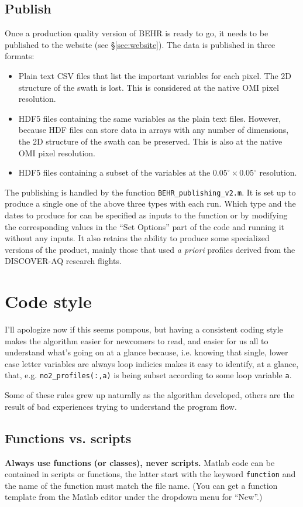 \documentclass[12pt]{article}
\begin{document}
	
	\subsection{Publish}
	Once a production quality version of BEHR is ready to go, it needs to be published to the website (see \S\ref{sec:website}). The data is published in three formats:
	\begin{itemize}
	\item Plain text CSV files that list the important variables for each pixel. The 2D structure of the swath is lost. This is considered at the native OMI pixel resolution.
	\item HDF5 files containing the same variables as the plain text files. However, because HDF files can store data in arrays with any number of dimensions, the 2D structure of the swath can be preserved. This is also at the native OMI pixel resolution.
	\item HDF5 files containing a subset of the variables at the $0.05^\circ \times 0.05^\circ$ resolution.
	\end{itemize}
	
	The publishing is handled by the function \lstinline$BEHR_publishing_v2.m$. It is set up to produce a single one of the above three types with each run. Which type and the dates to produce for can be specified as inputs to the function or by modifying the corresponding values in the ``Set Options'' part of the code and running it without any inputs. It also retains the ability to produce some specialized versions of the product, mainly those that used \emph{a priori} profiles derived from the DISCOVER-AQ research flights.
	

\section{Code style}
	I'll apologize now if this seems pompous, but having a consistent coding style makes the algorithm easier for newcomers to read, and easier for us all to understand what's going on at a glance because, i.e. knowing that single, lower case letter variables are always loop indicies makes it easy to identify, at a glance, that, e.g. \lstinline$no2_profiles(:,a)$ is being subset according to some loop variable \lstinline$a$.
	
	Some of these rules grew up naturally as the algorithm developed, others are the result of bad experiences trying to understand the program flow.
	
\subsection{Functions vs. scripts}
	\textbf{Always use functions (or classes), never scripts.} Matlab code can be contained in scripts or functions, the latter start with the keyword \lstinline$function$ and the name of the function must match the file name. (You can get a function template from the Matlab editor under the dropdown menu for ``New''.)
	
\end{document}
